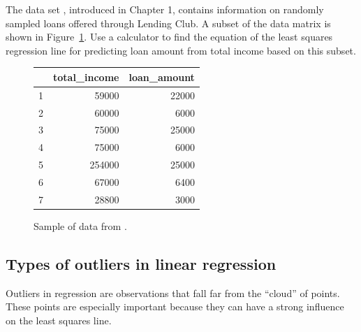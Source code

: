 \newpage

\begin{exercisewrap}
\begin{nexercise}\label{subsetOfLoan50}%
The data set , introduced in Chapter 1, contains information on randomly sampled loans offered through Lending Club.  A subset of the data matrix is shown in
Figure~\ref{data_for_regr_calc_exercise_loan50}.  Use a calculator to find the equation of the least squares regression line for predicting loan amount from total income based on this subset.\footnotemark 
\end{nexercise}
\end{exercisewrap}

\begin{figure}[ht]
\centering
\begin{tabular}{rrr}
  \hline
 & total\_income & loan\_amount \\ 
  \hline
1 & 59000 & 22000 \\ 
  2 & 60000 & 6000 \\ 
  3 & 75000 & 25000 \\ 
  4 & 75000 & 6000 \\ 
  5 & 254000 & 25000 \\ 
  6 & 67000 & 6400 \\ 
  7 & 28800 & 3000 \\ 
   \hline
\end{tabular}
\caption{Sample of data from .}
\label{data_for_regr_calc_exercise_loan50}
\end{figure}



\D{\newpage}

\subsection{Types of outliers in linear regression }
\label{typesOfOutliersInLinearRegression}

Outliers in regression are observations that fall far from the ``cloud'' of points. These points are especially important because they can have a strong influence on the least squares line. 

